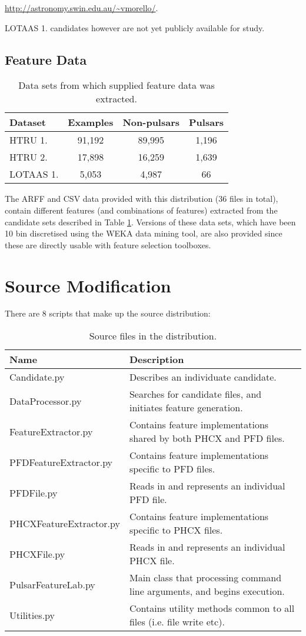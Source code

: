 \documentclass[twoside,a4paper]{refart}
\begin{document}
\url{http://astronomy.swin.edu.au/~vmorello/}. 

LOTAAS 1. candidates however are not yet publicly available for study.

\subsection{Feature Data}
\begin{table}[h]
    \begin{tabular}{|p{3.8cm}|c|c|c|}
    \hline
    Dataset & Examples & Non-pulsars & Pulsars \\ \hline\hline
    HTRU 1. & 91,192 & 89,995 & 1,196 \\
    HTRU 2. & 17,898 & 16,259 & 1,639 \\
    LOTAAS 1. & 5,053 & 4,987 & 66 \\\hline
    \end{tabular}
\caption[Data]{Data sets from which supplied feature data was extracted.}
\label{tab:data}
\end{table}
The ARFF and CSV data provided with this distribution (36 files in total), contain different features (and combinations of features) extracted from the candidate sets described in Table \ref{tab:data}. Versions of these data sets, which have been 10 bin discretised using the WEKA data mining tool, are also provided since these are directly usable with feature selection toolboxes.
\section{Source Modification}
There are 8 scripts that make up the source distribution:
\begin{table}[h]
\begin{tabular}{|l|p{6cm}|}
\hline
Name & Description \\ \hline\hline
Candidate.py           & Describes an individuate candidate.\\ \hline
DataProcessor.py       & Searches for candidate files, and initiates feature generation.\\ \hline
FeatureExtractor.py    & Contains feature implementations shared by both PHCX and PFD files.\\ \hline
PFDFeatureExtractor.py & Contains feature implementations specific to PFD files.\\ \hline
PFDFile.py             & Reads in and represents an individual PFD file.\\ \hline
PHCXFeatureExtractor.py& Contains feature implementations specific to PHCX files.\\ \hline
PHCXFile.py            & Reads in and represents an individual PHCX file.\\ \hline
PulsarFeatureLab.py    & Main class that processing command line arguments, and begins execution.\\ \hline
Utilities.py           & Contains utility methods common to all files (i.e. file write etc).\\ \hline
\end{tabular}
\caption[]{Source files in the distribution.}
\label{tab:files}
\end{table}
\end{document}
